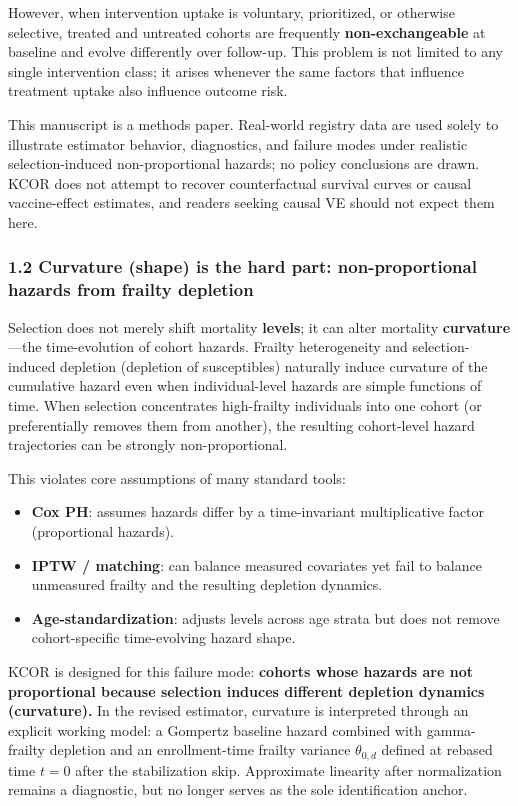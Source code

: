 \documentclass[
]{article}
\providecommand{\tightlist}{%
  \setlength{\itemsep}{0pt}\setlength{\parskip}{0pt}}
\begin{document}
However, when intervention uptake is voluntary, prioritized, or
otherwise selective, treated and untreated cohorts are frequently
\textbf{non-exchangeable} at baseline and evolve differently over
follow-up. This problem is not limited to any single intervention class;
it arises whenever the same factors that influence treatment uptake also
influence outcome risk.

This manuscript is a methods paper. Real-world registry data are used
solely to illustrate estimator behavior, diagnostics, and failure modes
under realistic selection-induced non-proportional hazards; no policy
conclusions are drawn. KCOR does not attempt to recover counterfactual
survival curves or causal vaccine-effect estimates, and readers seeking
causal VE should not expect them here.

\subsubsection{1.2 Curvature (shape) is the hard part: non-proportional
hazards from frailty
depletion}\label{curvature-shape-is-the-hard-part-non-proportional-hazards-from-frailty-depletion}

Selection does not merely shift mortality \textbf{levels}; it can alter
mortality \textbf{curvature}---the time-evolution of cohort hazards.
Frailty heterogeneity and selection-induced depletion (depletion of
susceptibles) naturally induce curvature of the cumulative hazard even
when individual-level hazards are simple functions of time. When
selection concentrates high-frailty individuals into one cohort (or
preferentially removes them from another), the resulting cohort-level
hazard trajectories can be strongly non-proportional.

This violates core assumptions of many standard tools:

\begin{itemize}
\tightlist
\item
  \textbf{Cox PH}: assumes hazards differ by a time-invariant
  multiplicative factor (proportional hazards).
\item
  \textbf{IPTW / matching}: can balance measured covariates yet fail to
  balance unmeasured frailty and the resulting depletion dynamics.
\item
  \textbf{Age-standardization}: adjusts levels across age strata but
  does not remove cohort-specific time-evolving hazard shape.
\end{itemize}

KCOR is designed for this failure mode: \textbf{cohorts whose hazards
are not proportional because selection induces different depletion
dynamics (curvature).} In the revised estimator, curvature is
interpreted through an explicit working model: a Gompertz baseline
hazard combined with gamma-frailty depletion and an enrollment-time
frailty variance \(\theta_{0,d}\) defined at rebased time \(t=0\) after
the stabilization skip. Approximate linearity after normalization
remains a diagnostic, but no longer serves as the sole identification
anchor.
\end{document}
